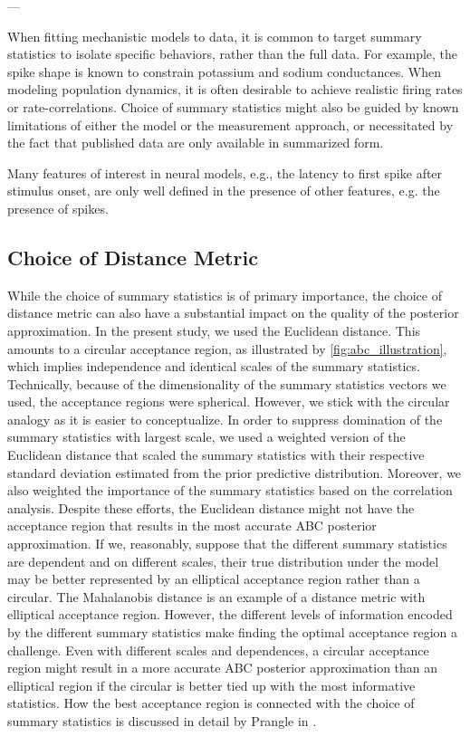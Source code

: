 ---

When fitting mechanistic models to data, it is common to target summary statistics to isolate specific behaviors, rather than the full data. For example, the spike shape is known to constrain potassium and sodium conductances. When modeling population dynamics, it is often desirable to achieve realistic firing rates or rate-correlations. Choice of summary statistics might also be guided by known limitations of either the model or the measurement approach, or necessitated by the fact that published data are only available in summarized form. 

Many features of interest in neural models, e.g., the latency to first spike after stimulus onset, are only well defined in the presence of other features, e.g. the presence of spikes. 

\subsection{Choice of Distance Metric}

While the choice of summary statistics is of primary importance, the choice of distance metric can also have a substantial impact on the quality of the posterior approximation. In the present study, we used the Euclidean distance. This amounts to a circular acceptance region, as illustrated by \autoref{fig:abc_illustration}, which implies independence and identical scales of the summary statistics. Technically, because of the dimensionality of the summary statistics vectors we used, the acceptance regions were spherical. However, we stick with the circular analogy as it is easier to conceptualize. In order to suppress domination of the summary statistics with largest scale, we used a weighted version of the Euclidean distance that scaled the summary statistics with their respective standard deviation estimated from the prior predictive distribution. Moreover, we also weighted the importance of the summary statistics based on the correlation analysis. Despite these efforts, the Euclidean distance might not have the acceptance region that results in the most accurate ABC posterior approximation. If we, reasonably, suppose that the different summary statistics are dependent and on different scales, their true distribution under the model may be better represented by an elliptical acceptance region rather than a circular. The Mahalanobis distance is an example of a distance metric with elliptical acceptance region. However, the different levels of information encoded by the different summary statistics make finding the optimal acceptance region a challenge. Even with different scales and dependences, a circular acceptance region might result in a more accurate ABC posterior approximation than an elliptical region if the circular is better tied up with the most informative statistics. How the best acceptance region is connected with the choice of summary statistics is discussed in detail by Prangle in \cite{prangle_distance}. 



